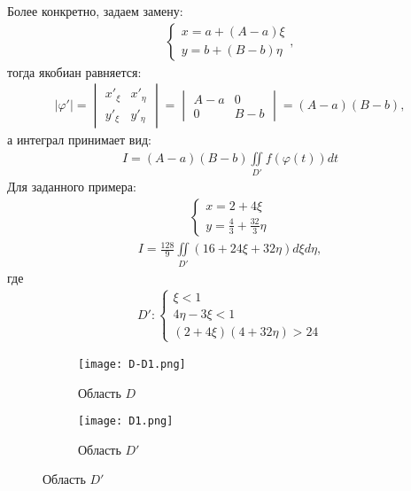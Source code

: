 Более конкретно, задаем замену:
\begin{align}
	\begin{cases}
		x = a + (A - a) \xi \\
		y = b + (B - b) \eta
	\end{cases},
\end{align}
тогда якобиан равняется:
\begin{align}
	|\varphi'| = \begin{vmatrix}
		             x'_\xi & x'_\eta \\
		             y'_\xi & y'_\eta
	             \end{vmatrix} = \begin{vmatrix}
		                             A - a & 0     \\
		                             0     & B - b
	                             \end{vmatrix} = (A - a) (B - b),
\end{align}
а интеграл принимает вид:
\begin{align}\label{eq:ab-iint}
	I = (A - a)(B - b)\iint\limits_{D'}f(\varphi(t))dt
\end{align}
Для заданного примера:
\begin{align}
	\begin{cases}
		x = 2 + 4 \xi \\
		y = \frac{4}{3} + \frac{32}{3} \eta
	\end{cases}
\end{align}
\begin{align}
	I = \frac{128}{9}\iint\limits_{D'}(16 + 24\xi + 32\eta)d\xi d\eta,
\end{align}
где
\begin{align}
	D'\colon \begin{cases}
		         \xi < 1      \\
		         4\eta-3\xi<1 \\
		         (2+4\xi)(4+32\eta)>24
	         \end{cases}
\end{align}

\begin{figure}[h]
	\begin{subfigure}{.5\textwidth}
		\centering
		\texttt{[image: D-D1.png]}
		\caption{Область \(D\)}
	\end{subfigure}
	\begin{subfigure}{.5\textwidth}
		\centering
		\texttt{[image: D1.png]}
		\caption{Область \(D'\)}
	\end{subfigure}
\end{figure}
